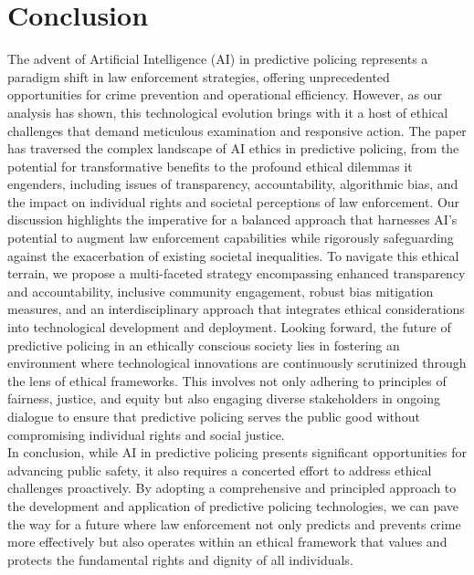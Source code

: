 \documentclass[man, noextraspace]{apa7} %
\begin{document}
\section{Conclusion}
The advent of Artificial Intelligence (AI) in predictive policing represents a paradigm shift in law enforcement strategies, offering unprecedented opportunities for crime prevention and operational efficiency. However, as our analysis has shown, this technological evolution brings with it a host of ethical challenges that demand meticulous examination and responsive action. The paper has traversed the complex landscape of AI ethics in predictive policing, from the potential for transformative benefits to the profound ethical dilemmas it engenders, including issues of transparency, accountability, algorithmic bias, and the impact on individual rights and societal perceptions of law enforcement.
Our discussion highlights the imperative for a balanced approach that harnesses AI's potential to augment law enforcement capabilities while rigorously safeguarding against the exacerbation of existing societal inequalities. To navigate this ethical terrain, we propose a multi-faceted strategy encompassing enhanced transparency and accountability, inclusive community engagement, robust bias mitigation measures, and an interdisciplinary approach that integrates ethical considerations into technological development and deployment.
Looking forward, the future of predictive policing in an ethically conscious society lies in fostering an environment where technological innovations are continuously scrutinized through the lens of ethical frameworks. This involves not only adhering to principles of fairness, justice, and equity but also engaging diverse stakeholders in ongoing dialogue to ensure that predictive policing serves the public good without compromising individual rights and social justice.\\
In conclusion, while AI in predictive policing presents significant opportunities for advancing public safety, it also requires a concerted effort to address ethical challenges proactively. By adopting a comprehensive and principled approach to the development and application of predictive policing technologies, we can pave the way for a future where law enforcement not only predicts and prevents crime more effectively but also operates within an ethical framework that values and protects the fundamental rights and dignity of all individuals.

\newpage
\end{document}
